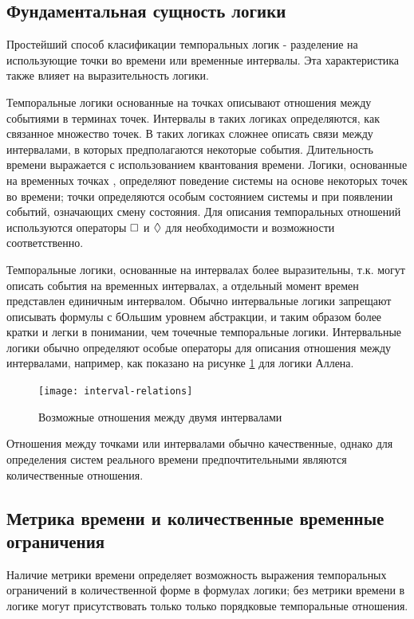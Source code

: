 		\subsection{Фундаментальная сущность логики}
		 Простейший способ класификации темпоральных логик - разделение на использующие точки во времени или временные интервалы.
		 Эта характеристика также влияет на выразительность логики.
		 
		 Темпоральные логики основанные на точках описывают отношения между событиями в терминах точек.
		 Интервалы в таких логиках определяются, как связанное множество точек.
		 В таких логиках сложнее описать связи между интервалами, в которых предполагаются некоторые события.
		 Длительность времени выражается с использованием квантования времени.
		 Логики, основанные на временных точках \cite{Manna} \cite{Rosner}, определяют поведение системы на основе некоторых точек во времени; точки определяются особым состоянием системы и при появлении событий, означающих смену состояния.
		 Для описания темпоральных отношений используются операторы $ \square $ и $ \lozenge $ для необходимости и возможности соответственно.
		 
		 Темпоральные логики, основанные на интервалах более выразительны, т.к. могут описать события на временных интервалах, а отдельный момент времен представлен единичным интервалом.
		 Обычно интервальные логики запрещают описывать формулы с бОльшим уровнем абстракции, и таким образом более кратки и легки в понимании, чем точечные темпоральные логики.
		 Интервальные логики обычно определяют особые операторы для описания отношения между интервалами, например, как показано на рисунке \ref{fig:interval-relations} для логики Аллена.
		\begin{figure}[h]
			\centering
			\texttt{[image: interval-relations]}
			\caption{Возможные отношения между двумя интервалами}
			\label{fig:interval-relations}
		\end{figure}
	
		Отношения между точками или интервалами обычно качественные, однако для определения систем реального времени предпочтительными являются количественные отношения. 
		\subsection{Метрика времени и количественные временные ограничения}
		 Наличие метрики времени определяет возможность выражения темпоральных ограничений в количественной форме в формулах логики; без метрики времени в логике могут присутствовать только только порядковые темпоральные отношения.
		 
